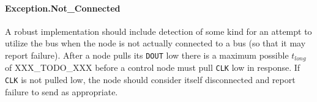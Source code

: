 \paragraph{Exception.{\sc Not\_Connected}}
A robust implementation should include detection of some kind for an attempt
to utilize the bus when the node is not actually connected to a bus (so that
it may report failure). After a node pulls its {\tt DOUT} low there is a
maximum possible $t_{long}$ of XXX\_TODO\_XXX before a control node must pull
{\tt CLK} low in response. If {\tt CLK} is not pulled low, the node should
consider itself disconnected and report failure to send as appropriate.
